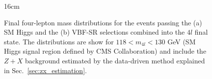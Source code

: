 \begin{figure}[hbtp]{16cm}
	\caption{Final four-lepton mass distributions for the events passing the (a) SM Higgs and the (b) VBF-SR selections combined into the $4l$ final state. The distributions are show for $118 < m_{4l} < 130$ GeV (SM Higgs signal region defined by CMS Collaboration) and include the $Z+X$ background estimated by the data-driven method explained in Sec.~\ref{sec:zx_estimation}.}
	\centering
	\label{fig:vbf_m4l_distribution}
\end{figure}


